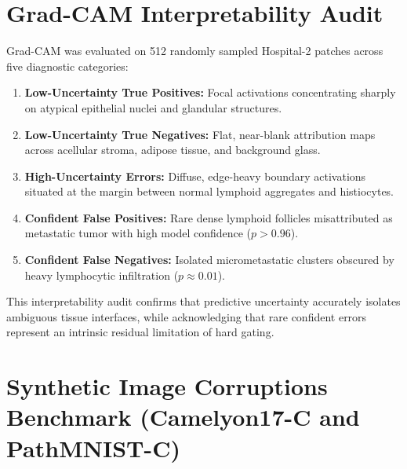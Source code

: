\documentclass[journal]{IEEEtran}
\begin{document}
\section{Grad-CAM Interpretability Audit}
\label{sec:supp_gradcam}

Grad-CAM was evaluated on 512 randomly sampled Hospital-2 patches across five diagnostic categories:
\begin{enumerate}
\item \textbf{Low-Uncertainty True Positives:} Focal activations concentrating sharply on atypical epithelial nuclei and glandular structures.
\item \textbf{Low-Uncertainty True Negatives:} Flat, near-blank attribution maps across acellular stroma, adipose tissue, and background glass.
\item \textbf{High-Uncertainty Errors:} Diffuse, edge-heavy boundary activations situated at the margin between normal lymphoid aggregates and histiocytes.
\item \textbf{Confident False Positives:} Rare dense lymphoid follicles misattributed as metastatic tumor with high model confidence ($p > 0.96$).
\item \textbf{Confident False Negatives:} Isolated micrometastatic clusters obscured by heavy lymphocytic infiltration ($p \approx 0.01$).
\end{enumerate}
This interpretability audit confirms that predictive uncertainty accurately isolates ambiguous tissue interfaces, while acknowledging that rare confident errors represent an intrinsic residual limitation of hard gating.

\section{Synthetic Image Corruptions Benchmark (Camelyon17-C and PathMNIST-C)}
\label{sec:supp_corruptions}
\end{document}
